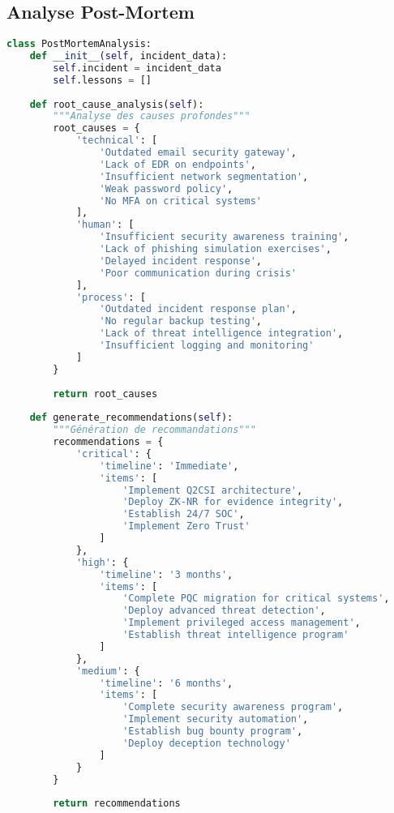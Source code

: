 \subsection{Analyse Post-Mortem}
\begin{lstlisting}[language=Python, caption=Analyse des causes profondes]
class PostMortemAnalysis:
    def __init__(self, incident_data):
        self.incident = incident_data
        self.lessons = []
    
    def root_cause_analysis(self):
        """Analyse des causes profondes"""
        root_causes = {
            'technical': [
                'Outdated email security gateway',
                'Lack of EDR on endpoints',
                'Insufficient network segmentation',
                'Weak password policy',
                'No MFA on critical systems'
            ],
            'human': [
                'Insufficient security awareness training',
                'Lack of phishing simulation exercises',
                'Delayed incident response',
                'Poor communication during crisis'
            ],
            'process': [
                'Outdated incident response plan',
                'No regular backup testing',
                'Lack of threat intelligence integration',
                'Insufficient logging and monitoring'
            ]
        }
        
        return root_causes
    
    def generate_recommendations(self):
        """Génération de recommandations"""
        recommendations = {
            'critical': {
                'timeline': 'Immediate',
                'items': [
                    'Implement Q2CSI architecture',
                    'Deploy ZK-NR for evidence integrity',
                    'Establish 24/7 SOC',
                    'Implement Zero Trust'
                ]
            },
            'high': {
                'timeline': '3 months',
                'items': [
                    'Complete PQC migration for critical systems',
                    'Deploy advanced threat detection',
                    'Implement privileged access management',
                    'Establish threat intelligence program'
                ]
            },
            'medium': {
                'timeline': '6 months',
                'items': [
                    'Complete security awareness program',
                    'Implement security automation',
                    'Establish bug bounty program',
                    'Deploy deception technology'
                ]
            }
        }
        
        return recommendations
\end{lstlisting}

